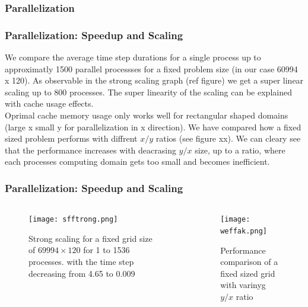 \documentclass{beamer}
\begin{document}
%
%
%
\begin{frame}
\frametitle{Parallelization}

\end{frame}
%
%
%
\begin{frame}
\frametitle{Parallelization: Speedup and Scaling}
\justify
We compare the average time step durations for a single process up to approximatly 1500 parallel processses for a fixed problem size (in our case 60994 x 120). As observable in the strong scaling graph (ref figure) we get a super linear scaling up to 800 processes. 
The super linearity of the scaling can be explained with cache usage effects. \\
\vspace{2mm}
Oprimal cache memory usage only works well for rectangular shaped domains (large x small y for parallelization in x direction). We have compared how a fixed sized problem performs with diffrent $x/y$ ratios (see figure xx). We can cleary see that the performance increases with deacrasing $y/x$ size, up to a ratio, where each processes computing domain gets too small and becomes inefficient. 
\end{frame}
%
%
%
\begin{frame}
\frametitle{Parallelization: Speedup and Scaling}
\begin{minipage}[1\textheight]{\textwidth}
\begin{columns}[T]
\begin{column}{0.5\textwidth}
\begin{figure}
\texttt{[image: sfftrong.png]}
\caption{Strong scaling for a fixed grid size of $69994\times 120$ for 1 to 1536 processes. with the time step decreasing from 4.65 to 0.009}
\end{figure}
\end{column}
\begin{column}{0.5\textwidth}
\begin{figure}
\texttt{[image: weffak.png]}
\caption{Performance comparison of a fixed sized grid with varinyg $y/x$ ratio}
\end{figure}
\end{column}
\end{columns}
\end{minipage}
\end{frame}
%
%
%
\end{document}

